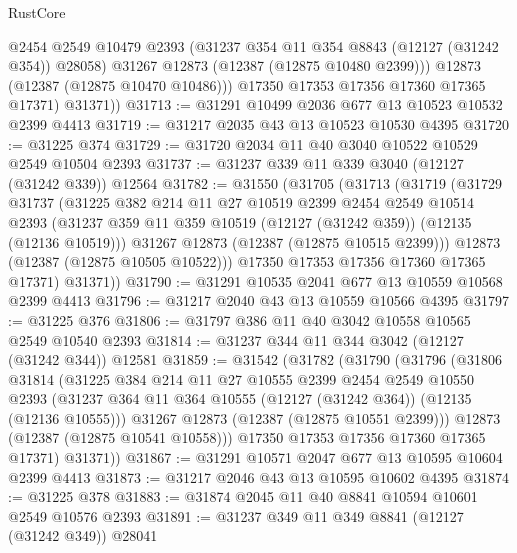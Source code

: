 \begin{lexlean}{RustCore}
\begin{coremodule}
              @2454
              @2549
              @10479
              @2393
              (@31237 @354 @11 @354 @8843 (@12127 (@31242 @354)) @28058)
              @31267
              @12873
              (@12387 (@12875 @10480 @2399)))
            @12873
            (@12387 (@12875 @10470 @10486)))
          @17350
          @17353
          @17356
          @17360
          @17365
          @17371)
        @31371))
@31713 := @31291 @10499 @2036 @677 @13 @10523 @10532 @2399 @4413
@31719 := @31217 @2035 @43 @13 @10523 @10530 @4395
@31720 := @31225 @374
@31729 := @31720 @2034 @11 @40 @3040 @10522 @10529 @2549 @10504 @2393
@31737 := @31237 @339 @11 @339 @3040 (@12127 (@31242 @339)) @12564
@31782 := @31550
    (@31705
      (@31713
        (@31719
          (@31729
            @31737
            (@31225
              @382
              @214
              @11
              @27
              @10519
              @2399
              @2454
              @2549
              @10514
              @2393
              (@31237 @359 @11 @359 @10519 (@12127 (@31242 @359)) (@12135 (@12136 @10519)))
              @31267
              @12873
              (@12387 (@12875 @10515 @2399)))
            @12873
            (@12387 (@12875 @10505 @10522)))
          @17350
          @17353
          @17356
          @17360
          @17365
          @17371)
        @31371))
@31790 := @31291 @10535 @2041 @677 @13 @10559 @10568 @2399 @4413
@31796 := @31217 @2040 @43 @13 @10559 @10566 @4395
@31797 := @31225 @376
@31806 := @31797 @386 @11 @40 @3042 @10558 @10565 @2549 @10540 @2393
@31814 := @31237 @344 @11 @344 @3042 (@12127 (@31242 @344)) @12581
@31859 := @31542
    (@31782
      (@31790
        (@31796
          (@31806
            @31814
            (@31225
              @384
              @214
              @11
              @27
              @10555
              @2399
              @2454
              @2549
              @10550
              @2393
              (@31237 @364 @11 @364 @10555 (@12127 (@31242 @364)) (@12135 (@12136 @10555)))
              @31267
              @12873
              (@12387 (@12875 @10551 @2399)))
            @12873
            (@12387 (@12875 @10541 @10558)))
          @17350
          @17353
          @17356
          @17360
          @17365
          @17371)
        @31371))
@31867 := @31291 @10571 @2047 @677 @13 @10595 @10604 @2399 @4413
@31873 := @31217 @2046 @43 @13 @10595 @10602 @4395
@31874 := @31225 @378
@31883 := @31874 @2045 @11 @40 @8841 @10594 @10601 @2549 @10576 @2393
@31891 := @31237 @349 @11 @349 @8841 (@12127 (@31242 @349)) @28041

\end{coremodule}
\end{lexlean}
